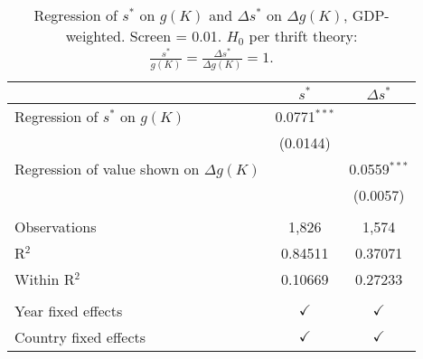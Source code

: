 \begin{table}[pos=h]
\caption{Regression of \(s^*\) on \(g(K)\) and \(\Delta s^*\) on \(\Delta g(K)\), GDP-weighted. Screen = 0.01. \(H_0\) per thrift theory: \(\frac{s^*}{g(K)} = \frac{\Delta s^*}{\Delta g(K)} = 1\).}
\centering
\begin{tabularx}{\columnwidth}{lcc}
   \toprule
                                               & $s^*$          & $\Delta s^*$ \\    
   \midrule 
   Regression of $s^*$ on \(g(K)\)             & 0.0771$^{***}$ &   \\   
                                               & (0.0144)       &   \\   
   Regression of value shown on $\Delta g(K)$  &                & 0.0559$^{***}$\\   
                                               &                & (0.0057)\\   
    \\
   Observations                                & 1,826          & 1,574\\  
   R$^2$                                       & 0.84511        & 0.37071\\  
   Within R$^2$                                & 0.10669        & 0.27233\\  
    \\
   Year fixed effects                          & $\checkmark$   & $\checkmark$\\   
   Country fixed effects                       & $\checkmark$   & $\checkmark$\\   
   \bottomrule
\end{tabularx}
   \label{tbl-reg_s}
\end{table}